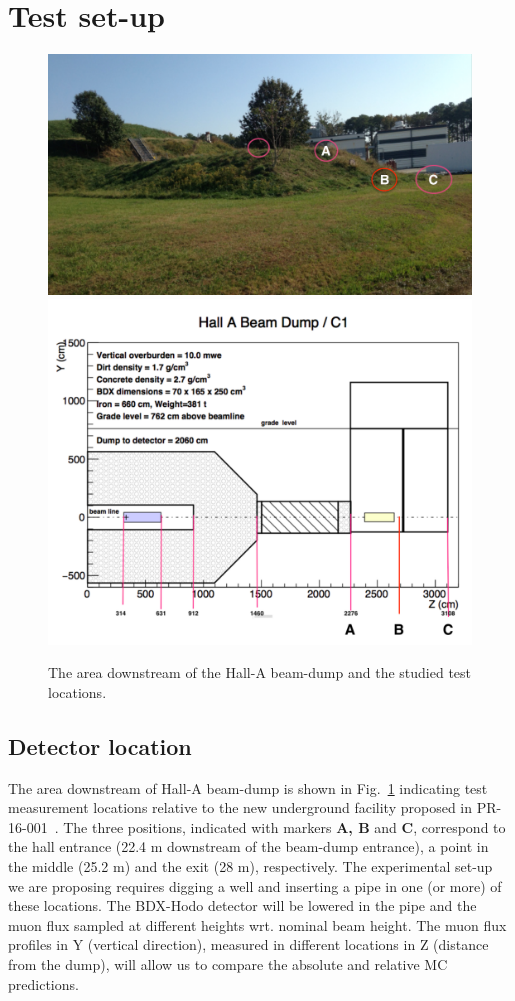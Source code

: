 \section{Test set-up}
\label{sec:setup}
\begin{figure}[h!] 
\center  
\includegraphics[width=11.5cm]{figs/ds-area.pdf}   
\includegraphics[width=11.5cm]{figs/test-plan.pdf}  
\caption{The area downstream of the Hall-A beam-dump and the studied test locations.}
\label{fig:ds-area}
\end{figure}

\subsection{Detector location}
The area downstream of Hall-A beam-dump is shown in Fig.~\ref{fig:ds-area}  indicating test measurement locations relative to the 
new  underground facility proposed in PR-16-001~\cite{bdx-proposal}. The three positions, indicated with markers {\bf A, B}  and {\bf C},  correspond to the hall entrance (22.4 m downstream of the beam-dump entrance), a point in the middle  (25.2 m) and the exit (28 m), respectively. The experimental set-up we are proposing requires digging a well and inserting a pipe in one (or more) of these locations. The BDX-Hodo detector will be lowered in the pipe and the muon flux sampled at different heights wrt. nominal beam height. The muon flux profiles in Y (vertical direction), measured in  different locations in Z (distance from the dump), will allow us to compare the absolute and relative MC predictions. 

